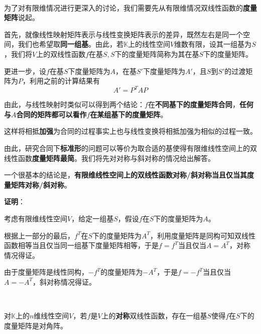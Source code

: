\documentclass[a4paper,UTF8,fontset=windows,AutoFakeBold]{ctexart}
\newcommand*{\note}{\noindent *}
\newcommand{\proo}[1]{{\vspace{5pt}\kaishu\noindent\textbf{证明}：\vspace{-3pt}
\begin{compactitem}
    \item[] #1
\end{compactitem}
}}
\begin{document}
\

为了对有限维情况进行更深入的讨论，我们需要先从有限维情况双线性函数的\textbf{度量矩阵}说起。

首先，就像线性映射矩阵表示与线性变换矩阵表示的差异，既然左右是同一个空间，我们也希望取\textbf{同一组基}。由此，若$\mathbb{K}$上的线性空间$V$维数有限，设其一组基为$S$，我们将$V$上的双线性函数$f$在基$S,S$下的度量矩阵简称为其在基$S$下的度量矩阵。

更进一步，设$f$在基$S$下度量矩阵为$A$，在基$S'$下度量矩阵为$A'$，且$S$到$S'$的过渡矩阵为$P$，利用之前的计算结果有
$$A'=P^TAP$$

由此，与线性映射时类似可以得到两个结论：$f$在\textbf{不同基下的度量矩阵合同}，\textbf{任何与$A$合同的矩阵都可以看作$f$在某组基下的度量矩阵}。

\note 这样将相抵\textbf{加强}为合同的过程事实上也与线性变换将相抵加强为相似的过程一致。

由此，研究合同下\textbf{标准形}的问题可以等价为取合适的基使得有限维线性空间上的双线性函数\textbf{度量矩阵最简}。我们将先对对称与斜对称的情况给出解答。

一个很基本的结论是，\textbf{有限维线性空间上的双线性函数对称/斜对称当且仅当其度量矩阵对称/斜对称}。

\proo{
    考虑有限维线性空间$V$，给定一组基$S$，假设$f$在$S$下的度量矩阵为$A$。

    根据上一部分的最后，$f^T$在$S$下的度量矩阵为$A^T$，利用度量矩阵是同构可知双线性函数相等当且仅当同一组基下度量矩阵相等，于是$f=f^T$当且仅当$A=A^T$，对称情况得证。

    由于度量矩阵是线性同构，$-f^T$的度量矩阵为$-A^T$，于是$f=-f^T$当且仅当$A=-A^T$，斜对称情况得证。
}

\

对$\mathbb{K}$上的$n$维线性空间$V$，若$f$是$V$上的\textbf{对称}双线性函数，存在一组基$S$使得$f$在$S$下的度量矩阵是对角阵。
\end{document}
